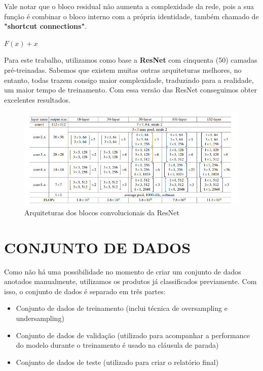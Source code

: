 Vale notar que o bloco residual não aumenta a complexidade da rede, pois a sua função é combinar o bloco interno com a própria identidade, também chamado de \textbf{"shortcut connections"}.

\begin{center}
    $F(x) + x$
\end{center}

Para este trabalho, utilizamos como base a \textbf{ResNet} com cinquenta (50) camadas pré-treinadas. Sabemos que existem muitas outras arquiteturas melhores, no entanto, todas trazem consigo maior complexidade, traduzindo para a realidade, um maior tempo de treinamento. Com essa versão das ResNet conseguimos obter excelentes resultados.

\begin{figure}[htb]
	\caption{\label{resnet_convs} Arquiteturas dos blocos convolucionais da ResNet}
	\begin{center}
	    \includegraphics[width=\textwidth]{artigo/recursos/imagens/resnet_convs.png}
	\end{center}
\end{figure}


\section{CONJUNTO DE DADOS}

Como não há uma possibilidade no momento de criar um conjunto de dados anotados manualmente, utilizamos os produtos já classificados previamente. Com isso, o conjunto de dados é separado em três partes:


\begin{itemize}
\item Conjunto de dados de treinamento (inclui técnica de oversampling e undersampling)
\item Conjunto de dados de validação (utilizado para acompanhar a performance do modelo durante o treinamento é usado na cláusula de parada)
\item Conjunto de dados de teste (utilizado para criar o relatório final)
\end{itemize}

